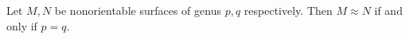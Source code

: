 Let $M, N$ be nonorientable surfaces of genus $p, q$ respectively. Then $M \approx N$ if and only if $p = q$.
